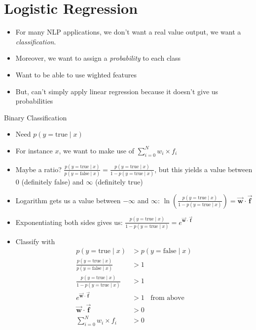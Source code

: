 \documentclass[11pt,letterpaper]{article}
\newcommand{\vv}[1]{\ensuremath{\vec{\mathbf{#1}}}}
\begin{document}
\section{Logistic Regression}

\begin{itemize}
  \item For many NLP applications, we don't want a real value output, we want a \textit{classification}.
  \item Moreover, we want to assign a \textit{probability} to each class
  \item Want to be able to use wighted features
  \item But, can't simply apply linear regression because it doesn't give us probabilities
\end{itemize}

Binary Classification

\begin{itemize}
  \item Need $p(y=\text{true} \mid x)$
  \item For instance $x$, we want to make use of $\sum_{i=0}^N w_i \times f_i$
  \item Maybe a ratio?  $\frac{p(y=\text{true} \mid x)}{p(y=\text{false} \mid x)} = \frac{p(y=\text{true} \mid x)}{1-p(y=\text{true} \mid x)}$, but this yields a value between 0 (definitely false) and $\infty$ (definitely true)
  \item Logarithm gets us a value between $-\infty$ and $\infty$: $\ln(\frac{p(y=\text{true} \mid x)}{1-p(y=\text{true} \mid x)}) = \vv{w} \cdot \vv{f}$
  \item Exponentiating both sides gives us: $\frac{p(y=\text{true} \mid x)}{1-p(y=\text{true} \mid x)} = e^{\vv{w} \cdot \vv{f}}$
  \item Classify with \vspace{-5mm}
    \begin{align*} 
      p(y=\text{true}\mid x) &> p(y=\text{false}\mid x) \\
      \frac{p(y=\text{true}\mid x)}{p(y=\text{false}\mid x)} &> 1 \\
      \frac{p(y=\text{true}\mid x)}{1-p(y=\text{true}\mid x)} &> 1 \\
      e^{\vv{w} \cdot \vv{f}} &> 1  ~~~~\text{from above} \\
      \vv{w} \cdot \vv{f} &> 0 \\
      \sum_{i=0}^N w_i \times f_i &> 0
     \end{align*}
\end{itemize}
\end{document}
